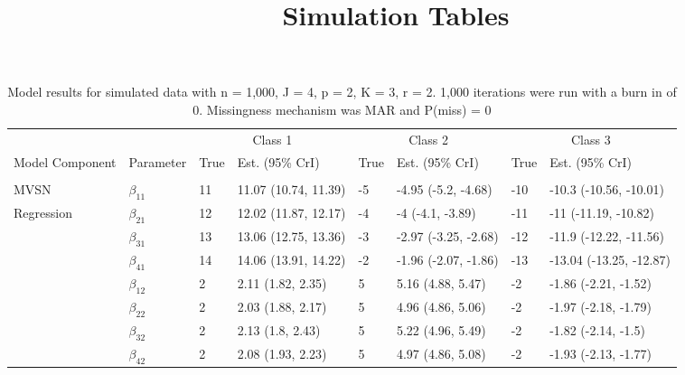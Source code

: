 \documentclass[]{article}
\title{Simulation Tables}
\author{}
\date{}
\begin{document}
\maketitle

\begin{table}[t]

\caption{\label{tab:unnamed-chunk-5}Model results for simulated data with n = 1,000, J = 4, p = 2, K = 3, r = 2. 1,000 iterations were run with a burn in of 0. Missingness mechanism was MAR and P(miss) = 0}
\centering
\fontsize{8}{10}\selectfont
\begin{tabular}{llllllll}
\toprule
\multicolumn{2}{c}{ } & \multicolumn{2}{c}{Class 1} & \multicolumn{2}{c}{Class 2} & \multicolumn{2}{c}{Class 3} \\
\cmidrule(l{3pt}r{3pt}){3-4} \cmidrule(l{3pt}r{3pt}){5-6} \cmidrule(l{3pt}r{3pt}){7-8}
Model Component & Parameter & True & Est. (95\% CrI) & True & Est. (95\% CrI) & True & Est. (95\% CrI)\\
\midrule
\addlinespace[0.3em]
\multicolumn{8}{l}{\textbf{ }}\\
\hspace{1em}MVSN & $\beta_{11}$ & 11 & 11.07 (10.74, 11.39) & -5 & -4.95 (-5.2, -4.68) & -10 & -10.3 (-10.56, -10.01)\\
\hspace{1em}Regression & $\beta_{21}$ & 12 & 12.02 (11.87, 12.17) & -4 & -4 (-4.1, -3.89) & -11 & -11 (-11.19, -10.82)\\
\hspace{1em} & $\beta_{31}$ & 13 & 13.06 (12.75, 13.36) & -3 & -2.97 (-3.25, -2.68) & -12 & -11.9 (-12.22, -11.56)\\
\hspace{1em} & $\beta_{41}$ & 14 & 14.06 (13.91, 14.22) & -2 & -1.96 (-2.07, -1.86) & -13 & -13.04 (-13.25, -12.87)\\
\hspace{1em} & $\beta_{12}$ & 2 & 2.11 (1.82, 2.35) & 5 & 5.16 (4.88, 5.47) & -2 & -1.86 (-2.21, -1.52)\\
\hspace{1em} & $\beta_{22}$ & 2 & 2.03 (1.88, 2.17) & 5 & 4.96 (4.86, 5.06) & -2 & -1.97 (-2.18, -1.79)\\
\hspace{1em} & $\beta_{32}$ & 2 & 2.13 (1.8, 2.43) & 5 & 5.22 (4.96, 5.49) & -2 & -1.82 (-2.14, -1.5)\\
\hspace{1em} & $\beta_{42}$ & 2 & 2.08 (1.93, 2.23) & 5 & 4.97 (4.86, 5.08) & -2 & -1.93 (-2.13, -1.77)\\

\end{tabular}
\end{table}
\end{document}
